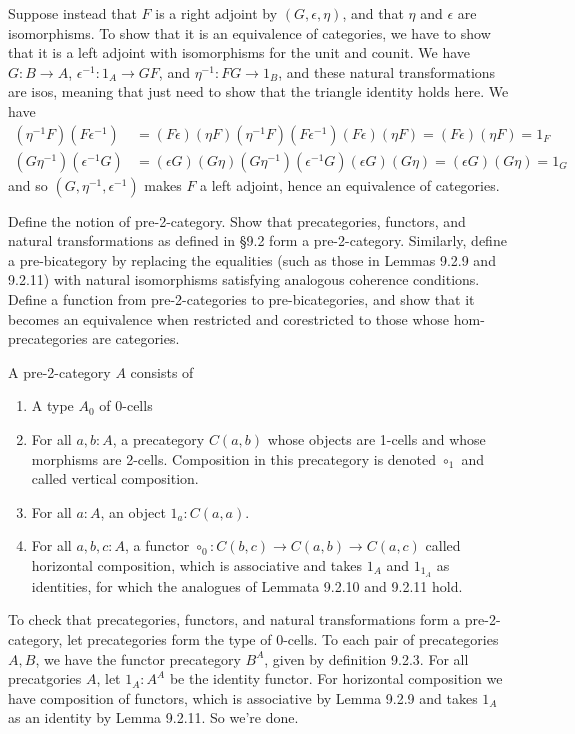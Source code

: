 Suppose instead that $F$ is a right adjoint by $(G, \epsilon, \eta)$, and that
$\eta$ and $\epsilon$ are isomorphisms.  To show that it is an equivalence of
categories, we have to show that it is a left adjoint with isomorphisms for the
unit and counit.  We have $G : B \to A$, $\epsilon^{-1} : 1_{A} \to GF$, and
$\eta^{-1} : FG \to 1_{B}$, and these natural transformations are isos, meaning
that just need to show that the triangle identity holds here.  We have
\begin{align*}
  (\eta^{-1}F)(F\epsilon^{-1})
  &=
  (F\epsilon)(\eta F)
  (\eta^{-1}F)(F\epsilon^{-1})
  (F\epsilon)(\eta F)
  =
  (F\epsilon)
  (\eta F)
  =
  1_{F}
  \\
  (G \eta^{-1})(\epsilon^{-1} G)
  &=
  (\epsilon G)(G \eta)
  (G \eta^{-1})(\epsilon^{-1} G)
  (\epsilon G)(G \eta)
  =
  (\epsilon G)(G \eta)
  =
  1_{G}
\end{align*}
and so $(G, \eta^{-1}, \epsilon^{-1})$ makes $F$ a left adjoint, hence an
equivalence of categories.


Define the notion of pre-2-category.  Show that precategories, functors, and
natural transformations as defined in \S9.2 form a pre-2-category.  Similarly,
define a pre-bicategory by replacing the equalities (such as those in Lemmas
9.2.9 and 9.2.11) with natural isomorphisms satisfying analogous coherence
conditions.  Define a function from pre-2-categories to pre-bicategories, and
show that it becomes an equivalence when restricted and corestricted to those
whose hom-precategories are categories.


 \soln
A pre-2-category $A$ consists of
\begin{enumerate}
  \item A type $A_{0}$ of 0-cells
  \item For all $a, b : A$, a precategory $C(a, b)$ whose objects are 1-cells
  and whose morphisms are 2-cells.  Composition in this precategory is denoted
  $\circ_{1}$ and called vertical composition.
  \item For all $a : A$, an object $1_{a} : C(a, a)$.
  \item For all $a, b, c : A$, a functor $\circ_{0} : C(b, c) \to C(a, b) \to
  C(a, c)$ called horizontal composition, which is associative and takes
  $1_{A}$ and $1_{1_{A}}$ as identities, for which the analogues of Lemmata
  9.2.10 and 9.2.11 hold.
\end{enumerate}


To check that precategories, functors, and natural transformations form a
pre-2-category, let precategories form the type of 0-cells.  To each pair of
precategories $A, B$, we have the functor precategory $B^{A}$, given by
definition 9.2.3.  For all precatgories $A$, let $1_{A} : A^{A}$ be the
identity functor.  For horizontal composition we have composition of functors,
which is associative by Lemma 9.2.9 and takes $1_{A}$ as an identity by Lemma
9.2.11.  So we're done.


